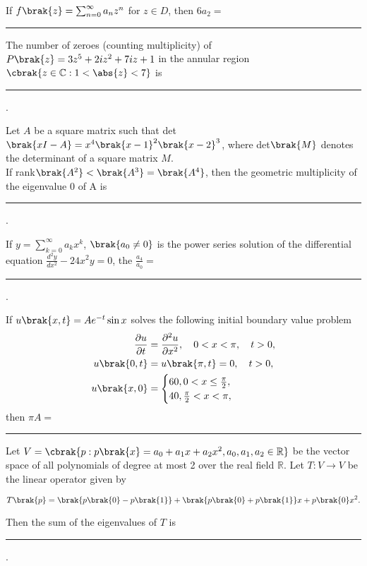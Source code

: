 If $f\brak{z} = \sum^\infty_{n=0}a_nz^n$ for $z \in D$, then $6a_2=$\rule{2cm}{0.15mm}
\item The number of zeroes (counting multiplicity) of $P\brak{z} = 3z^5+2iz^2+7iz+1$ in the annular region $\cbrak{z\in \mathbb{C}:1<\abs{z}<7}$ is \rule{2cm}{0.15mm}.
\item Let $A$ be a square matrix such that det$\brak{xI-A}=x^4\brak{x-1}^2\brak{x-2}^3$, where det$\brak{M}$ denotes the determinant of a square matrix $M$.\\
If rank$\brak{A^2}<\brak{A^3}=\brak{A^4}$, then the geometric multiplicity of the eigenvalue 0 of A is \rule{2cm}{0.15mm}.
\item If $y = \sum^\infty_{k=0}a_kx^k$, $\brak{a_0\neq0}$ is the power series solution of the differential equation $\frac{d^2y}{dx^2}-24x^2y=0$, the $\frac{a_4}{a_0}=$ \rule{2cm}{0.15mm}.
\item If $u\brak{x,t}=Ae^{-t}\sin x$ solves the following initial boundary value problem\\
\begin{align*}
    \frac{\partial u}{\partial t} &= \frac{\partial^2 u}{\partial x^2}, \quad 0 < x < \pi, \quad t > 0, \\
    u\brak{0,t} &= u\brak{\pi,t} = 0, \quad t > 0, \\
    u\brak{x,0} &= \begin{cases}
        60,  0 < x \leq \frac{\pi}{2}, \\
        40,  \frac{\pi}{2} < x < \pi,
    \end{cases}
\end{align*}
then $\pi A=$\rule{2cm}{0.15mm}
\item Let $V = \cbrak{p: p\brak{x} = a_0 + a_1x + a_2x^2, a_0, a_1, a_2 \in \mathbb{R}}$ be the vector space of all polynomials of degree at most 2 over the real field $\mathbb{R}$. Let $T: V \rightarrow V$ be the linear operator given by

$$T\brak{p} = \brak{p\brak{0} - p\brak{1}} + \brak{p\brak{0} + p\brak{1}}x + p\brak{0}x^2.$$

Then the sum of the eigenvalues of $T$ is \rule{2cm}{0.15mm}.
